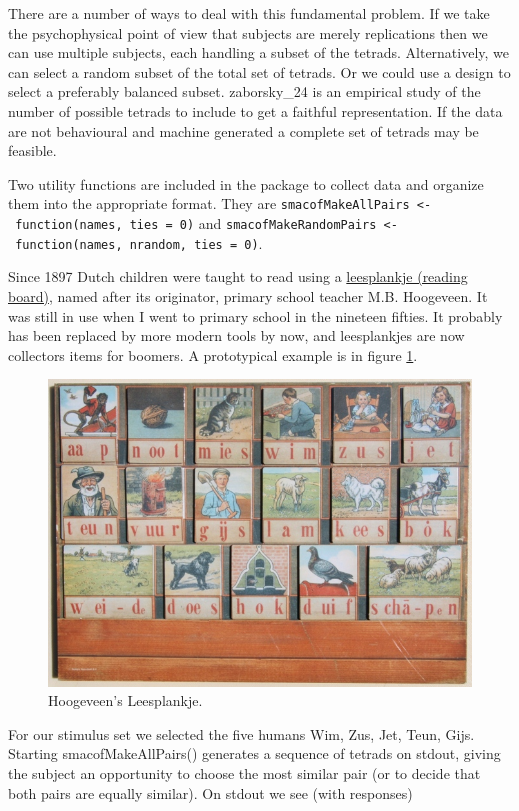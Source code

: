 \documentclass[
  12pt,
]{article}
\begin{document}
There are a number of ways to deal with this fundamental problem. If we take the psychophysical point of view that subjects are merely replications then we
can use multiple subjects, each handling a subset of the tetrads.
Alternatively, we can select a random subset of the total set of tetrads.
Or we could use a design to select a preferably balanced subset. zaborsky\_24 is an empirical study of the number of possible tetrads to include to get a faithful representation. If the data are not behavioural and machine generated a complete set of tetrads may be feasible.

Two utility functions are included in the package to collect data and organize them into the appropriate format. They are \texttt{smacofMakeAllPairs\ \textless{}-\ function(names,\ ties\ =\ 0)} and \texttt{smacofMakeRandomPairs\ \textless{}-\ function(names,\ nrandom,\ ties\ =\ 0)}.

Since 1897 Dutch children were taught to read using a
\href{https://nl.wikipedia.org/wiki/Leesplankje_van_Hoogeveen}{leesplankje (reading board)},
named after its originator, primary school teacher M.B. Hoogeveen.
It was still in use when I went to primary school in the nineteen
fifties. It probably has been replaced by more modern tools by now, and
leesplankjes are now collectors items for boomers. A prototypical example is in figure \ref{fig:hoogeveenjpg}.

\begin{figure}

{\centering \includegraphics[width=0.5\linewidth]{graphics/leesplankje} 

}

\caption{Hoogeveen's Leesplankje.}\label{fig:hoogeveenjpg}
\end{figure}

For our stimulus set we selected the five humans Wim, Zus, Jet, Teun, Gijs.
Starting smacofMakeAllPairs() generates a sequence of tetrads on stdout,
giving the subject an opportunity to choose the most similar pair (or to
decide that both pairs are equally similar). On stdout we see (with responses)
\end{document}
